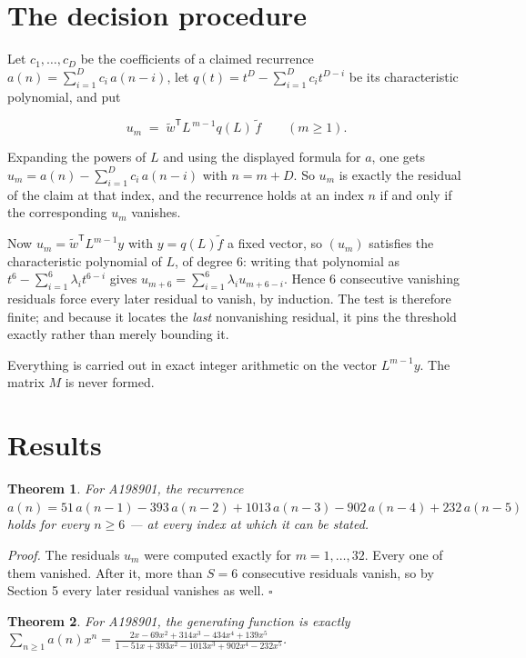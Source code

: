 \documentclass[11pt]{article}
\newtheorem{theorem}{Theorem}
\theoremstyle{definition}
\begin{document}
\section{The decision procedure}

Let $c_1,\dots,c_D$ be the coefficients of a claimed recurrence $a(n) = \sum_{i=1}^{D} c_i\,a(n-i)$, let $q(t) = t^{D} - \sum_{i=1}^{D} c_i t^{D-i}$ be its characteristic polynomial, and put

\[u_m \;=\; \tilde w^{\mathsf T} L^{\,m-1} q(L)\,\tilde f \qquad (m \ge 1).\]

Expanding the powers of $L$ and using the displayed formula for $a$, one gets $u_m = a(n) - \sum_{i=1}^{D} c_i\,a(n-i)$ with $n = m + D$. So $u_m$ is exactly the residual of the claim at that index, and the recurrence holds at an index $n$ if and only if the corresponding $u_m$ vanishes.

Now $u_m = \tilde w^{\mathsf T} L^{m-1} y$ with $y = q(L)\tilde f$ a fixed vector, so $(u_m)$ satisfies the characteristic polynomial of $L$, of degree $6$: writing that polynomial as $t^{6} - \sum_{i=1}^{6} \lambda_i t^{6-i}$ gives $u_{m+6} = \sum_{i=1}^{6} \lambda_i u_{m+6-i}$. Hence $6$ consecutive vanishing residuals force every later residual to vanish, by induction. The test is therefore finite; and because it locates the {\itshape last} nonvanishing residual, it pins the threshold exactly rather than merely bounding it.

Everything is carried out in exact integer arithmetic on the vector $L^{m-1}y$. The matrix $M$ is never formed.

\section{Results}

\begin{theorem} For A198901, the recurrence $a(n) = 51\,a(n-1) - 393\,a(n-2) + 1013\,a(n-3) - 902\,a(n-4) + 232\,a(n-5)$ holds for every $n \ge 6$ --- at every index at which it can be stated.\end{theorem}

{\itshape Proof.} The residuals $u_m$ were computed exactly for $m = 1,\dots,32$. Every one of them vanished. After it, more than $S = 6$ consecutive residuals vanish, so by Section 5 every later residual vanishes as well. $\square$

\begin{theorem} For A198901, the generating function is exactly $\sum_{n\ge 1} a(n)x^n = \frac{2x - 69x^{2} + 314x^{3} - 434x^{4} + 139x^{5}}{1 - 51x + 393x^{2} - 1013x^{3} + 902x^{4} - 232x^{5}}$.\end{theorem}
\end{document}
